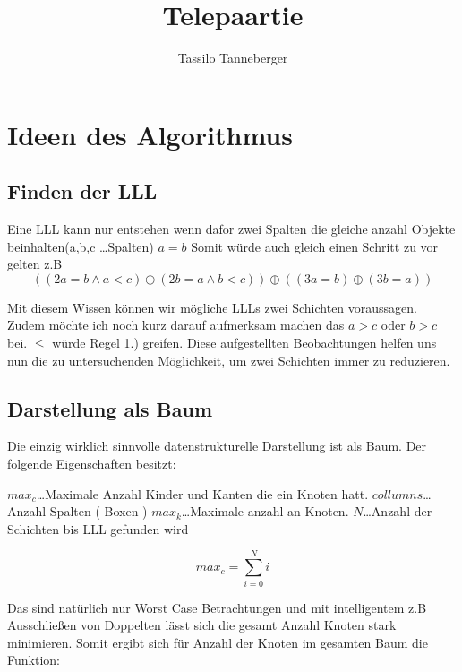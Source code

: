 \documentclass{article}
\begin{document}
\title{Telepaartie}
\author{Tassilo Tanneberger}

\maketitle

\section*{Ideen des Algorithmus}

\subsection*{ Finden der LLL}

Eine LLL kann nur entstehen wenn dafor zwei Spalten die gleiche anzahl Objekte beinhalten(a,b,c \dots Spalten) \( a = b\) Somit würde auch gleich einen Schritt zu vor gelten z.B 
\begin{equation}
	((2a = b \wedge a < c)  \oplus (2b = a \wedge b < c)) \oplus ((3a = b)  \oplus (3b = a))
\end{equation}

Mit diesem Wissen können wir mögliche LLLs zwei Schichten voraussagen. Zudem möchte ich noch kurz darauf aufmerksam machen das \(a>c\) oder \(b > c\) bei. \( \leq \) würde Regel 1.) greifen. Diese aufgestellten Beobachtungen helfen uns nun die zu untersuchenden Möglichkeit, um zwei Schichten immer zu reduzieren.

\subsection*{ Darstellung als Baum}

Die einzig wirklich sinnvolle datenstrukturelle Darstellung ist als Baum. Der folgende Eigenschaften besitzt: \newline

\(max_c\)\dots 				Maximale Anzahl Kinder und Kanten die ein Knoten hatt. \newline
\(collumns\)\dots 			Anzahl Spalten ( Boxen ) \newline
\(max_k\)\dots				Maximale anzahl an Knoten.  \newline
\(N\)\dots    					Anzahl der Schichten bis LLL gefunden wird

\begin{equation}
	max_c =  \sum \limits_{i=0}^N  i
\end{equation}

Das sind natürlich nur Worst Case Betrachtungen und mit intelligentem z.B Ausschließen von Doppelten lässt sich die gesamt Anzahl Knoten stark minimieren. Somit ergibt sich für Anzahl der Knoten im gesamten Baum die Funktion: \newline
\end{document}
